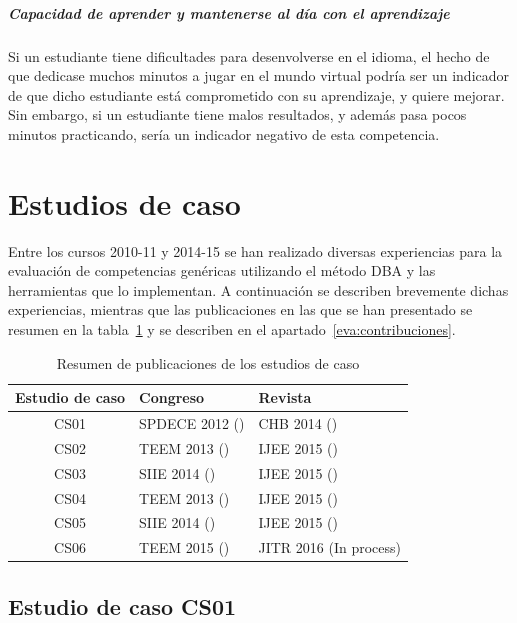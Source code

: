 			\subparagraph*{Capacidad de aprender y mantenerse al día con el aprendizaje}
			Si un estudiante tiene dificultades para desenvolverse en el idioma, el hecho de que dedicase muchos minutos a jugar en el mundo virtual podría ser un indicador de que dicho estudiante está comprometido con su aprendizaje, y quiere mejorar. Sin embargo, si un estudiante tiene malos resultados, y además pasa pocos minutos practicando, sería un indicador negativo de esta competencia.

\section{Estudios de caso}

	Entre los cursos 2010-11 y 2014-15 se han realizado diversas experiencias para la evaluación de competencias genéricas utilizando el método DBA y las herramientas que lo implementan. A continuación se describen brevemente dichas experiencias, mientras que las publicaciones en las que se han presentado se resumen en la tabla~\ref{tab:ResumenCS} y se describen en el apartado~\ref{eva:contribuciones}.


\begin{table}
	\centering
	\caption{Resumen de publicaciones de los estudios de caso}
	\label{tab:ResumenCS}
	\begin{tabular}{|c|l|l|}
		\hline
		Estudio de caso & Congreso & Revista \\
		\hline
		\hline
		CS01 & SPDECE 2012 (\cite{Balderas:2012}) & CHB 2014 (\cite{palomo2014scalability})  \\
		\hline
		CS02 & TEEM 2013 (\cite{balderas2013generative}) & IJEE 2015 (\cite{Balderas:2015})  \\
		\hline
		CS03 & SIIE 2014 (\cite{balderas2014domain})  & IJEE 2015 (\cite{Balderas:2015}) \\
		\hline
		CS04 & TEEM 2013 (\cite{balderas2013generative})   & IJEE 2015 (\cite{Balderas:2015})  \\
		\hline
		CS05 & SIIE 2014 (\cite{balderas2014domain}) &  IJEE 2015 (\cite{Balderas:2015}) \\
		\hline
		CS06 & TEEM 2015 (\cite{balderas2015domain}) & JITR 2016 (In process) \\
		\hline
	\end{tabular}
\end{table}

	\subsection{Estudio de caso CS01}

